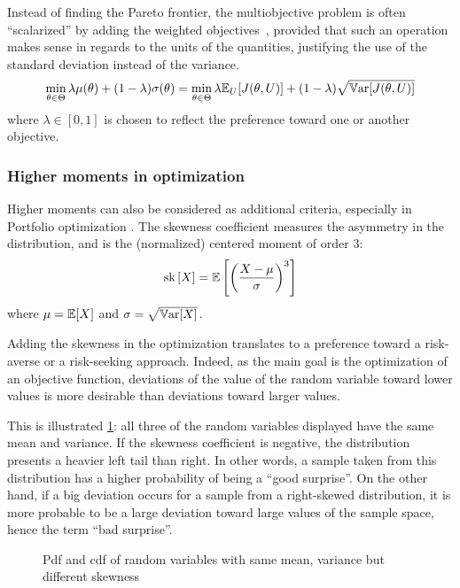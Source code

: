 \documentclass[../../Main_ManuscritThese.tex]{subfiles}
\newcommand\imgpath{/home/victor/acadwriting/Manuscrit/Text/Chapter3/img/}
\begin{document}
Instead of finding the Pareto frontier, the multiobjective problem is often ``scalarized'' by adding the weighted objectives~\cite{marler_weighted_2010}, provided that such an operation makes sense in regards to the units of the quantities, justifying the use of the standard deviation instead of the variance.
\begin{equation}
  \min_{\theta\in\Theta} \lambda \mu(\theta) + (1- \lambda)\sigma(\theta) =   \min_{\theta\in\Theta} \lambda \mathbb{E}_{U}[J(\theta,U)] + (1- \lambda)\sqrt{\mathbb{V}\mathrm{ar}[J(\theta,U)]}
\end{equation}
where $\lambda \in [0,1]$ is chosen to reflect the preference toward one or another objective.

\subsubsection{Higher moments in optimization}
\label{sec:higher_moments}
Higher moments can also be considered as additional criteria, especially in Portfolio optimization \cite{lai_mean-variance-skewness-kurtosis-based_2006,briec_mean-variance-skewness_2007}. 
The skewness coefficient measures the asymmetry in the distribution, and is the (normalized) centered moment of order $3$:
\begin{equation}
  \mathrm{sk}\left[X\right] = \mathbb{E}\left[\left(\frac{X - \mu}{\sigma}\right)^3\right]
\end{equation}
where $\mu = \mathbb{E}[X]$ and $\sigma = \sqrt{\mathbb{V}\mathrm{ar}[X]}$.

Adding the skewness in the optimization translates to a preference
toward a risk-averse or a risk-seeking approach. Indeed, as the main
goal is the optimization of an objective function, deviations of the
value of the random variable toward lower values is more desirable
than deviations toward larger values.

This is illustrated \cref{fig:skewness_example}: all three of the
random variables displayed have the same mean and variance.  If the
skewness coefficient is negative, the distribution presents a heavier
left tail than right. In other words, a sample taken from this
distribution has a higher probability of being a ``good surprise''. On
the other hand, if a big deviation occurs for a sample from a
right-skewed distribution, it is more probable to be a large deviation
toward large values of the sample space, hence the term ``bad
surprise''.

\begin{figure}[ht]
  \centering
  
  \caption[Influence of the skewness]{\label{fig:skewness_example} Pdf and cdf of random variables with same mean, variance but different skewness}
\end{figure}
\end{document}
